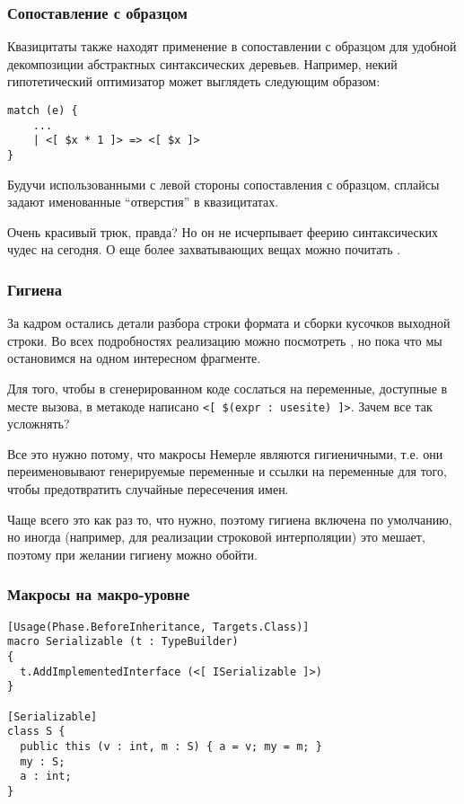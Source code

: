 \documentclass{beamer}
\begin{document}
\begin{frame}[t, fragile]
\frametitle{Сопоставление с образцом}

Квазицитаты также находят применение в сопоставлении с образцом для удобной декомпозиции абстрактных синтаксических деревьев. Например, некий гипотетический оптимизатор может выглядеть следующим образом:

\begin{lstlisting}[language=nemerle]
match (e) { 
    ... 
    | <[ $x * 1 ]> => <[ $x ]> 
} 
\end{lstlisting}

Будучи использованными с левой стороны сопоставления с образцом, сплайсы задают именованные ``отверстия'' в квазицитатах. 

Очень красивый трюк, правда? Но он не исчерпывает феерию синтаксических чудес на сегодня. О еще более захватывающих вещах можно почитать .

\end{frame}

\begin{frame}[t]
\frametitle{Гигиена}

За кадром остались детали разбора строки формата и сборки кусочков выходной строки. Во всех подробностях реализацию можно посмотреть , но пока что мы остановимся на одном интересном фрагменте.

Для того, чтобы в сгенерированном коде сослаться на переменные, доступные в месте вызова, в метакоде написано \texttt{<[ \$(expr : usesite) ]>}. Зачем все так усложнять?

Все это нужно потому, что макросы Немерле являются гигиеничными, т.е. они переименовывают генерируемые переменные и ссылки на переменные для того, чтобы предотвратить случайные пересечения имен. 

Чаще всего это как раз то, что нужно, поэтому гигиена включена по умолчанию, но иногда (например, для реализации строковой интерполяции) это мешает, поэтому при желании гигиену можно обойти.

\end{frame}

\begin{frame}[t, fragile]
\frametitle{Макросы на макро-уровне}

\begin{lstlisting}[language=nemerle]
[Usage(Phase.BeforeInheritance, Targets.Class)] 
macro Serializable (t : TypeBuilder) 
{ 
  t.AddImplementedInterface (<[ ISerializable ]>) 
} 
 
[Serializable] 
class S { 
  public this (v : int, m : S) { a = v; my = m; } 
  my : S; 
  a : int; 
} 
\end{lstlisting}
\end{frame}
\end{document}
